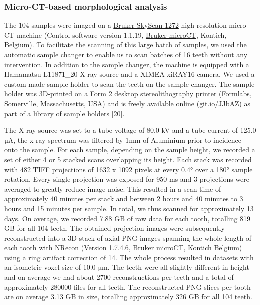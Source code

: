 \documentclass[
  american,
]{article}
\begin{document}
\hypertarget{micro-ct-based-morphological-analysis}{%
\subsubsection{Micro-CT-based morphological analysis}\label{micro-ct-based-morphological-analysis}}

The 104 samples were imaged on a \href{https://www.bruker.com/products/microtomography/micro-ct-for-sample-scanning/skyscan-1272/overview.html}{Bruker SkyScan 1272} high-resolution micro-CT machine (Control software version 1.1.19, \href{https://www.bruker.com/products/microtomography.html}{Bruker microCT}, Kontich, Belgium).
To facilitate the scanning of this large batch of samples, we used the automatic sample changer to enable us to scan batches of 16 teeth without any intervention.
In addition to the sample changer, the machine is equipped with a Hamamatsu L11871\_20 X-ray source and a XIMEA xiRAY16 camera.
We used a custom-made sample-holder to scan the teeth on the sample changer.
The sample holder was 3D-printed on a \href{https://formlabs.com/3d-printers/form-2/}{Form 2} desktop stereolithography printer (\href{https://formlabs.com/}{Formlabs}, Somerville, Massachusetts, USA) and is freely available online (\href{https://git.io/JJbAZ}{git.io/JJbAZ}) as part of a library of sample holders {[}\protect\hyperlink{ref-115PPSuQp}{20}{]}.

The X-ray source was set to a tube voltage of 80.0 kV and a tube current of 125.0 µA, the x-ray spectrum was filtered by 1mm of Aluminium prior to incidence onto the sample.
For each sample, depending on the sample height, we recorded a set of either 4 or 5 stacked scans overlapping its height.
Each stack was recorded with 482 TIFF projections of 1632 x 1092 pixels at every 0.4° over a 180° sample rotation.
Every single projection was exposed for 950 ms and 3 projections were averaged to greatly reduce image noise.
This resulted in a scan time of approximately 40 minutes per stack and between 2 hours and 40 minutes to 3 hours and 15 minutes per sample.
In total, we thus scanned for approximately 13 days.
On average, we recorded 7.88 GB of raw data for each tooth, totalling 819 GB for all 104 teeth.
The obtained projection images were subsequently reconstructed into a 3D stack of axial PNG images spanning the whole length of each tooth with NRecon (Version 1.7.4.6, Bruker microCT, Kontich Belgium) using a ring artifact correction of 14.
The whole process resulted in datasets with an isometric voxel size of 10.0 µm.
The teeth were all slightly different in height and on average we had about 2700 reconstructions per teeth and a total of approximately 280000 files for all teeth.
The reconstructed PNG slices per tooth are on average 3.13 GB in size, totalling approximately 326 GB for all 104 teeth.
\end{document}
